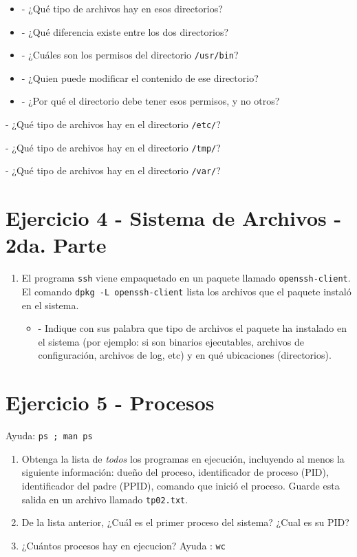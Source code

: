 \documentclass[12pt]{article}
\begin{document}
\begin{itemize}
\item - ¿Qué tipo de archivos hay en esos directorios?
\item - ¿Qué diferencia existe entre los dos directorios?
\item - ¿Cuáles son los permisos del directorio \texttt{/usr/bin}?
\item - ¿Quien puede modificar el contenido de ese directorio?
\item - ¿Por qué el directorio debe tener esos permisos, y no otros?
\end{itemize}

\item - ¿Qué tipo de archivos hay en el directorio \texttt{/etc/}?

\item - ¿Qué tipo de archivos hay en el directorio \texttt{/tmp/}?

\item - ¿Qué tipo de archivos hay en el directorio \texttt{/var/}?

\section*{Ejercicio 4 - Sistema de Archivos - 2da. Parte}
\begin{enumerate}
\item El programa \texttt{ssh} viene empaquetado en un paquete llamado \texttt{openssh-client}.
El comando \texttt{dpkg -L openssh-client} lista los archivos que el paquete instaló en el sistema.
\begin{itemize}
\item - Indique con sus palabra que tipo de archivos el paquete ha instalado en el sistema (por ejemplo: si son binarios ejecutables, archivos de configuración, archivos de log, etc) y en qué ubicaciones (directorios).
\end{itemize}
\end{enumerate}

\section*{Ejercicio 5 - Procesos}
Ayuda: \texttt{ps ; man ps}
\begin{enumerate}
\item Obtenga la lista de \textit{todos} los programas en ejecución, incluyendo al menos la siguiente información:
dueño del proceso, identificador de proceso (PID), identificador del padre (PPID),
comando que inició el proceso. Guarde esta salida en un archivo llamado \texttt{tp02.txt}.
\item De la lista anterior, ¿Cuál es el primer proceso del sistema? ¿Cual es su PID?
\item ¿Cuántos procesos hay en ejecucion? Ayuda : \texttt{wc}
\end{enumerate}
\end{document}
